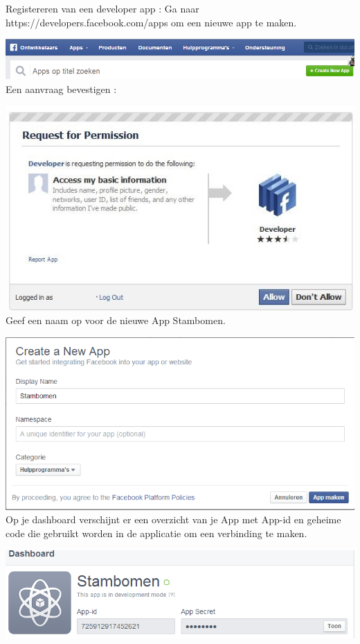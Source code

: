 \documentclass[pdftex,a4paper,12pt,twoside]{report}
\begin{document}
Registereren van een developer app :
Ga naar https://developers.facebook.com/apps om een nieuwe app te maken.

 \includegraphics{images/facebook4.png}\\
 
 Een aanvraag bevestigen : 
 
 \includegraphics{images/facebook.png}\\
 
 Geef een naam op voor de nieuwe App Stambomen.
 
 \includegraphics{images/facebook2.png}\\
 
 Op je dashboard verschijnt er een overzicht van je App met App-id en geheime code die gebruikt worden in de applicatie om een verbinding te maken.
 
 \includegraphics{images/facebook3.png}\\
 
\end{document}
